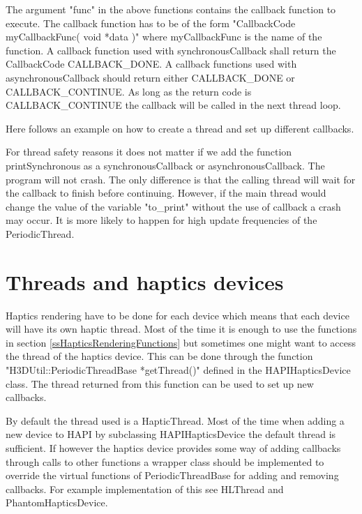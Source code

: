 The argument "func" in the above functions contains the callback function to
execute. The callback function has to be of the form
"CallbackCode myCallbackFunc( void *data )" where myCallbackFunc is the name of
the function. A callback function used with synchronousCallback shall
return the CallbackCode CALLBACK\_DONE. A callback functions used with
asynchronousCallback should return either CALLBACK\_DONE or CALLBACK\_CONTINUE.
As long as the return code is CALLBACK\_CONTINUE the callback will be called in
the next thread loop.

Here follows an example on how to create a thread and set up different
callbacks.



For thread safety reasons it does not matter if we add the function
printSynchronous as a synchronousCallback or asynchronousCallback. The program
will not crash. The only difference is that the calling thread will wait for
the callback to finish before continuing. However, if the main thread would
change the value of the variable "to\_print" without the use of callback a
crash may occur. It is more likely to happen for high update frequencies of the
PeriodicThread.

\section{Threads and haptics devices}
Haptics rendering have to be done for each device which means that each device
will have its own haptic thread. Most of the time it is enough to use the
functions in section \ref{ssHapticsRenderingFunctions} but sometimes one might
want to access the thread of the haptics device. This can be done through the
function "H3DUtil::PeriodicThreadBase *getThread()" defined in the
HAPIHapticsDevice class. The thread returned from this function can be used
to set up new callbacks.

By default the thread used is a HapticThread. Most of the time when adding a
new device to HAPI by subclassing HAPIHapticsDevice the default thread is
sufficient. If however the haptics device provides some way of adding callbacks
through calls to other functions a wrapper class should be implemented
to override the virtual functions of PeriodicThreadBase for adding and removing
callbacks. For example implementation of this see HLThread and PhantomHapticsDevice.